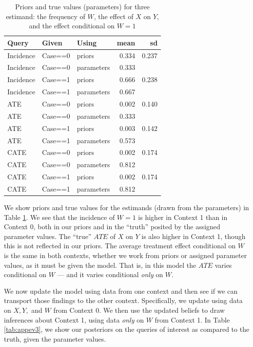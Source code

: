 \documentclass[
  12pt,
]{book}
\begin{document}
\begin{table}

\caption{\label{tab:appev2}Priors and true values (parameters) for three estimand: the frequency of $W$, the effect of $X$ on $Y$, and the effect conditional on $W=1$}
\centering
\begin{tabular}[t]{l|l|l|r|r}
\hline
Query & Given & Using & mean & sd\\
\hline
Incidence & Case==0 & priors & 0.334 & 0.237\\
\hline
Incidence & Case==0 & parameters & 0.333 & \\
\hline
Incidence & Case==1 & priors & 0.666 & 0.238\\
\hline
Incidence & Case==1 & parameters & 0.667 & \\
\hline
ATE & Case==0 & priors & 0.002 & 0.140\\
\hline
ATE & Case==0 & parameters & 0.333 & \\
\hline
ATE & Case==1 & priors & 0.003 & 0.142\\
\hline
ATE & Case==1 & parameters & 0.573 & \\
\hline
CATE & Case==0 & priors & 0.002 & 0.174\\
\hline
CATE & Case==0 & parameters & 0.812 & \\
\hline
CATE & Case==1 & priors & 0.002 & 0.174\\
\hline
CATE & Case==1 & parameters & 0.812 & \\
\hline
\end{tabular}
\end{table}

We show priors and true values for the estimands (drawn from the parameters) in Table \ref{tab:appev2}. We see that the incidence of \(W=1\) is higher in Context 1 than in Context 0, both in our priors and in the ``truth'' posited by the assigned parameter values. The ``true'' \(ATE\) of \(X\) on \(Y\) is also higher in Context 1, though this is not reflected in our priors. The average treatment effect conditional on \(W\) is the same in both contexts, whether we work from priors or assigned parameter values, as it must be given the model. That is, in this model the \(ATE\) varies conditional on \(W\) --- and it varies conditional \emph{only} on \(W\).

We now update the model using data from one context and then see if we can transport those findings to the other context. Specifically, we update using data on \(X, Y,\) and \(W\) from Context 0. We then use the updated beliefs to draw inferences about Context 1, using data \emph{only} on \(W\) from Context 1. In Table \ref{tab:appev3}, we show our posteriors on the queries of interest as compared to the truth, given the parameter values.
\end{document}
